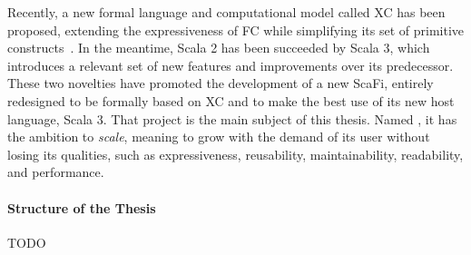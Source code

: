 Recently, a new formal language and computational model called \ac{XC} has been proposed, extending the expressiveness of \ac{FC} while simplifying its set of primitive constructs~\cite{xc}.
%
In the meantime, Scala 2 has been succeeded by Scala 3, which introduces a relevant set of new features and improvements over its predecessor.
%
These two novelties have promoted the development of a new ScaFi, entirely redesigned to be formally based on \ac{XC} and to make the best use of its new host language, Scala 3.
%
That project is the main subject of this thesis.
%
Named \quotes{\this}, it has the ambition to \textit{scale}, meaning to grow with the demand of its user without losing its qualities, such as expressiveness, reusability, maintainability, readability, and performance.


\paragraph{Structure of the Thesis}

TODO
